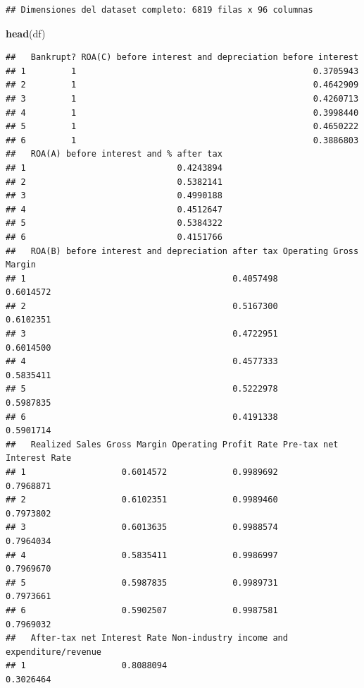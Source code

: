 \documentclass[
]{book}
\newenvironment{Shaded}{\begin{snugshade}}{\end{snugshade}}
\newcommand{\FunctionTok}[1]{\textcolor[rgb]{0.13,0.29,0.53}{\textbf{#1}}}
\newcommand{\NormalTok}[1]{#1}
\begin{document}
\begin{verbatim}
## Dimensiones del dataset completo: 6819 filas x 96 columnas
\end{verbatim}

\begin{Shaded}
\begin{Highlighting}[]
\FunctionTok{head}\NormalTok{(df)}
\end{Highlighting}
\end{Shaded}

\begin{verbatim}
##   Bankrupt? ROA(C) before interest and depreciation before interest
## 1         1                                               0.3705943
## 2         1                                               0.4642909
## 3         1                                               0.4260713
## 4         1                                               0.3998440
## 5         1                                               0.4650222
## 6         1                                               0.3886803
##   ROA(A) before interest and % after tax
## 1                              0.4243894
## 2                              0.5382141
## 3                              0.4990188
## 4                              0.4512647
## 5                              0.5384322
## 6                              0.4151766
##   ROA(B) before interest and depreciation after tax Operating Gross Margin
## 1                                         0.4057498              0.6014572
## 2                                         0.5167300              0.6102351
## 3                                         0.4722951              0.6014500
## 4                                         0.4577333              0.5835411
## 5                                         0.5222978              0.5987835
## 6                                         0.4191338              0.5901714
##   Realized Sales Gross Margin Operating Profit Rate Pre-tax net Interest Rate
## 1                   0.6014572             0.9989692                 0.7968871
## 2                   0.6102351             0.9989460                 0.7973802
## 3                   0.6013635             0.9988574                 0.7964034
## 4                   0.5835411             0.9986997                 0.7969670
## 5                   0.5987835             0.9989731                 0.7973661
## 6                   0.5902507             0.9987581                 0.7969032
##   After-tax net Interest Rate Non-industry income and expenditure/revenue
## 1                   0.8088094                                   0.3026464

\end{verbatim}
\end{document}
